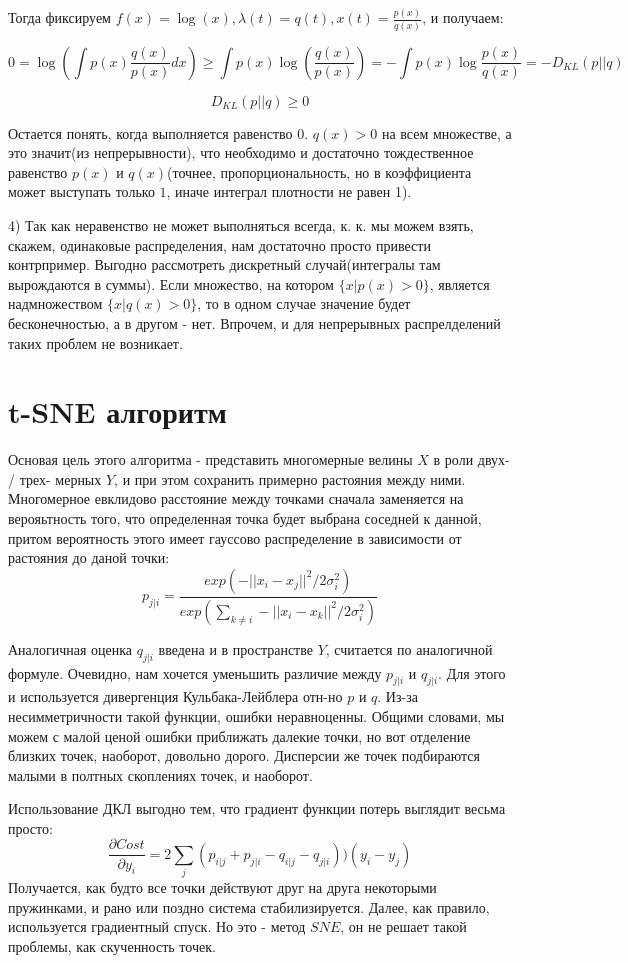 \documentclass{article}
\begin{document}
Тогда фиксируем $\displaystyle f(x) = \log(x), \lambda(t) = q(t), x(t) = \frac{p(x)}{q(x)}$, и получаем:

$$ 0 = \log\left(\int p(x)\frac{q(x)}{p(x)}dx\right) \geq  \int p(x) \log\left(\frac{q(x)}{p(x)}\right) =
  -\int p(x) \log\frac{p(x)}{q(x)} = -D_{KL}(p || q) $$
  
 $$ D_{KL}(p || q) \geq 0$$

Остается понять, когда выполняется равенство $0$. $q(x) > 0$ на всем множестве, а это значит(из непрерывности), что необходимо и достаточно тождественное равенство $p(x)$ и $q(x)$(точнее, пропорциональность, но в коэффициента может выступать только $1$, иначе интеграл плотности не равен 1).

4) Так как неравенство не может выполняться всегда, к. к. мы можем взять, скажем, одинаковые распределения, нам достаточно просто привести контрпример. Выгодно рассмотреть дискретный случай(интегралы там вырождаются в суммы). Если множество, на котором $\{x | p(x) > 0\}$, является надмножеством $\{x | q(x) > 0\}$, то в одном случае значение будет бесконечностью, а в другом - нет. Впрочем, и для непрерывных распрелделений таких проблем не возникает.

\section{t-SNE алгоритм}  
Основая цель этого алгоритма - представить многомерные велины $X$ в роли двух- / трех- мерных $Y$, и при этом сохранить примерно растояния между ними. Многомерное евклидово расстояние между точками сначала заменяется на верояьтность того, что определенная точка будет выбрана соседней к данной, притом вероятность этого имеет гауссово распределение в зависимости от растояния до даной точки:
$$ p_{j |i } = \frac{exp(-||x_i - x_j||^2 / 2 \sigma_i^2)}
{exp(\sum_{k \neq i}-||x_i - x_k||^2 / 2 \sigma_i^2)}$$

Аналогичная оценка $q_{j|i}$ введена и в пространстве $Y$, считается по аналогичной формуле. Очевидно, нам хочется уменьшить различие между $p_{j |i }$ и $q_{j |i }$. Для этого и используется дивергенция Кульбака-Лейблера отн-но $p$ и $q$. Из-за несимметричности такой функции, ошибки неравноценны. Общими словами, мы можем с малой ценой ошибки приближать далекие точки, но вот отделение близких точек, наоборот, довольно дорого. Дисперсии же точек подбираются малыми в полтных скоплениях точек, и наоборот.

Использование ДКЛ выгодно тем, что градиент функции потерь выглядит весьма просто:
$$\frac{\partial Cost}{\partial y_i} = 2\sum\limits_j (p_{i|j} + p_{j|i} - q_{i|j} - q_{j|i}))(y_i - y_j)$$
Получается, как будто все точки действуют друг на друга некоторыми пружинками, и рано или поздно система стабилизируется. Далее, как правило, используется градиентный спуск. Но это - метод $SNE$, он не решает такой проблемы, как скученность точек.
\end{document}
